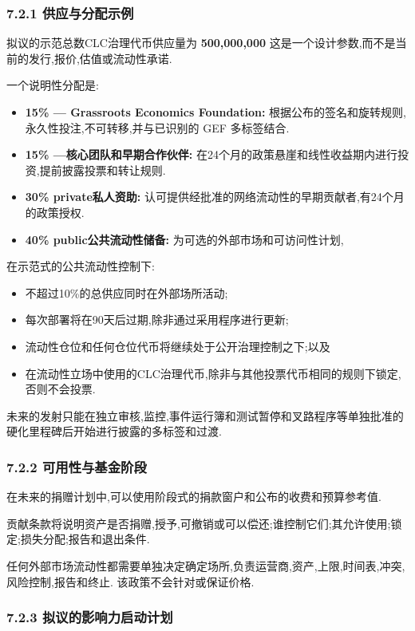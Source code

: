 \documentclass[11pt]{article}
\begin{document}
\subsubsection*{7.2.1 供应与分配示例}

拟议的示范总数CLC治理代币供应量为 \textbf{500,000,000} 这是一个设计参数,而不是当前的发行,报价,估值或流动性承诺.

一个说明性分配是:

\begin{itemize}[leftmargin=*]
\item \textbf{15\% --- Grassroots Economics Foundation:} 根据公布的签名和旋转规则,永久性投注,不可转移,并与已识别的 GEF 多标签结合.
\item \textbf{15\% ---核心团队和早期合作伙伴:} 在24个月的政策悬崖和线性收益期内进行投资,提前披露投票和转让规则.
\item \textbf{30\%  private私人资助:} 认可提供经批准的网络流动性的早期贡献者,有24个月的政策授权.
\item \textbf{40\%  public公共流动性储备:} 为可选的外部市场和可访问性计划,
\end{itemize}
在示范式的公共流动性控制下:

\begin{itemize}[leftmargin=*]
\item 不超过10\%的总供应同时在外部场所活动;
\item 每次部署将在90天后过期,除非通过采用程序进行更新;
\item 流动性仓位和任何仓位代币将继续处于公开治理控制之下;以及
\item 在流动性立场中使用的CLC治理代币,除非与其他投票代币相同的规则下锁定,否则不会投票.
\end{itemize}
未来的发射只能在独立审核,监控,事件运行簿和测试暂停和叉路程序等单独批准的硬化里程碑后开始进行披露的多标签和过渡.

\subsubsection*{7.2.2 可用性与基金阶段}

在未来的捐赠计划中,可以使用阶段式的捐款窗户和公布的收费和预算参考值.

贡献条款将说明资产是否捐赠,授予,可撤销或可以偿还;谁控制它们;其允许使用;锁定;损失分配;报告和退出条件.

任何外部市场流动性都需要单独决定确定场所,负责运营商,资产,上限,时间表,冲突,风险控制,报告和终止. 该政策不会针对或保证价格.

\subsubsection*{7.2.3 拟议的影响力启动计划}
\end{document}
